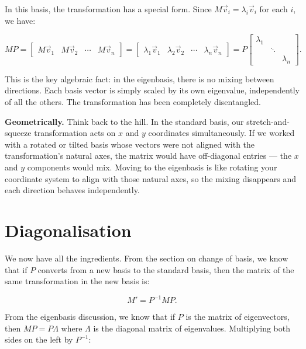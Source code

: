 \documentclass[11pt,openany]{book}
\theoremstyle{definition}
\begin{document}
In this basis, the transformation has a special form. Since $M\vec{v}_i = \lambda_i 
\vec{v}_i$ for each $i$, we have:

\[
MP = \begin{bmatrix} M\vec{v}_1 & M\vec{v}_2 & \cdots & M\vec{v}_n \end{bmatrix}
  = \begin{bmatrix} \lambda_1\vec{v}_1 & \lambda_2\vec{v}_2 & \cdots & \lambda_n\vec{v}_n \end{bmatrix}
  = P \begin{bmatrix} \lambda_1 & & \\ & \ddots & \\ & & \lambda_n \end{bmatrix}.
\]

\medskip

This is the key algebraic fact: in the eigenbasis, there is no mixing between 
directions. Each basis vector is simply scaled by its own eigenvalue, independently 
of all the others. The transformation has been completely disentangled.

\medskip

\textbf{Geometrically.} Think back to the hill. In the standard basis, our 
stretch-and-squeeze transformation acts on $x$ and $y$ coordinates simultaneously. 
If we worked with a rotated or tilted basis whose vectors were not aligned with the 
transformation's natural axes, the matrix would have off-diagonal entries --- 
the $x$ and $y$ components would mix. Moving to the eigenbasis is like rotating 
your coordinate system to align with those natural axes, so the mixing disappears 
and each direction behaves independently.

\section{Diagonalisation}

We now have all the ingredients. From the section on change of basis, we know that 
if $P$ converts from a new basis to the standard basis, then the matrix of the same 
transformation in the new basis is:

\[
M' = P^{-1}MP.
\]

From the eigenbasis discussion, we know that if $P$ is the matrix of eigenvectors, 
then $MP = P\Lambda$ where $\Lambda$ is the diagonal matrix of eigenvalues. 
Multiplying both sides on the left by $P^{-1}$:
\end{document}
